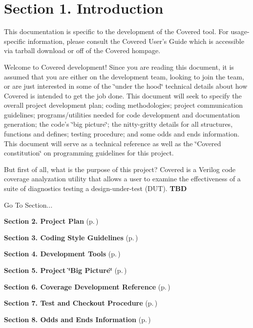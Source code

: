 \section{Section 1.  Introduction}\label{page_intro}
 

 This documentation is specific to the development of the Covered tool. For usage-specific information, please consult the Covered User's Guide which is accessible via tarball download or off of the Covered hompage.

 Welcome to Covered development! Since you are reading this document, it is assumed that you are either on the development team, looking to join the team, or are just interested in some of the \char`\"{}under the hood\char`\"{} technical details about how Covered is intended to get the job done. This document will seek to specify the overall project development plan; coding methodologies; project communication guidelines; programs/utilities needed for code development and documentation generation; the code's \char`\"{}big picture\char`\"{}; the nitty-gritty  details for all structures, functions and defines; testing procedure; and some odds and  ends information. This document will serve as a technical reference as well as the  \char`\"{}Covered constitution\char`\"{} on programming guidelines for this project.

 But first of all, what is the purpose of this project? Covered is a Verilog code coverage  analyzation utility that allows a user to examine the effectiveness of a suite of diagnostics testing a design-under-test (DUT). {\bf TBD}



\begin{Desc}
\item[Go To Section...]\par
\begin{CompactItemize}
\item 
{\bf Section 2.  Project Plan} {\rm (p.\,\pageref{page_project_plan})}\item 
{\bf Section 3.  Coding Style Guidelines} {\rm (p.\,\pageref{page_code_style})}\item 
{\bf Section 4.  Development Tools} {\rm (p.\,\pageref{page_tools})}\item 
{\bf Section 5.  Project \char`\"{}Big Picture\char`\"{}} {\rm (p.\,\pageref{page_big_picture})}\item 
{\bf Section 6.  Coverage Development Reference} {\rm (p.\,\pageref{page_code_details})}\item 
{\bf Section 7.  Test and Checkout Procedure} {\rm (p.\,\pageref{page_testing})}\item 
{\bf Section 8.  Odds and Ends Information} {\rm (p.\,\pageref{page_misc})}\end{CompactItemize}
\end{Desc}
